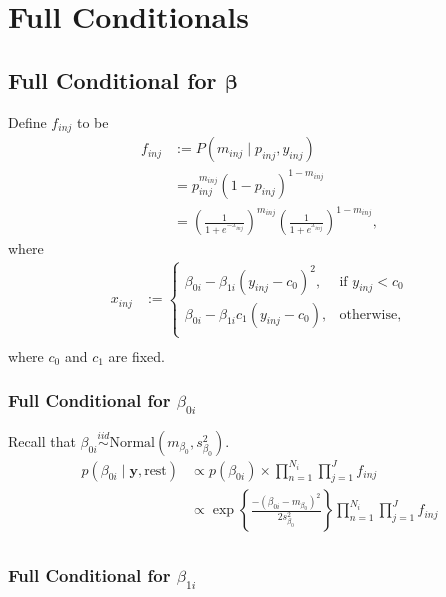 \documentclass[12pt]{article}
\newcommand{\p}[1]{\left(#1\right)}
\newcommand{\bc}[1]{ \left\{#1\right\} }
\newcommand{\N}{ \mathcal{N} }
\newcommand{\iid}{\overset{iid}{\sim}}
\def\N{\text{Normal}}
\def\y{\bm{y}}
\def\rest{\text{rest}}
\begin{document}
\section{Full Conditionals}\label{full-conditionals}

\subsection{\texorpdfstring{Full Conditional for
$\bm \beta$}{Full Conditional for \textbackslash{}bm \textbackslash{}beta}}\label{full-conditional-for-bm-beta}

Define $f_{inj}$ to be
%
\begin{align*}
f_{inj} &:= P(m_{inj} \mid p_{inj}, y_{inj}) \\
&= p_{inj}^{m_{inj}} (1-p_{inj})^{1 - m_{inj}} \\
&= \left(\frac{1}{1+e^{-x_{inj}}} \right)^{m_{inj}}\left(\frac{1}{1+e^{x_{inj}}} \right)^{1-m_{inj}},
\end{align*}
%
where
\begin{align*}
  x_{inj} &:= \begin{cases}
  \beta_{0i} - \beta_{1i}(y_{inj}-c_0)^2, & \text{if } y_{inj} < c_0\nonumber \\
  \beta_{0i} - \beta_{1i}c_1\p{y_{inj}-c_0}, & \text{otherwise}, \nonumber \\
  \end{cases}\\
\end{align*}
where $c_0$ and $c_1$ are fixed.

\subsubsection{\texorpdfstring{Full Conditional for
$\beta_{0i}$}{Full Conditional for \textbackslash{}beta\_\{0i\}}}\label{full-conditional-for-beta_0i}

Recall that $\beta_{0i} \iid \N(m_{\beta_0},s^2_{\beta_0})$.
\begin{align*}
p(\beta_{0i} \mid \y, \rest) &\propto
p(\beta_{0i}) \times \prod_{n=1}^{N_i} \prod_{j=1}^J f_{inj} \\
%
&\propto \exp\bc{\frac{-(\beta_{0i}-m_{\beta_0})^2}{2s^2_{\beta_0}}} \prod_{n=1}^{N_i} \prod_{j=1}^J f_{inj} \\
\end{align*}


\subsubsection{\texorpdfstring{Full Conditional for
$\beta_{1i}$}{Full Conditional for \textbackslash{}beta\_\{1i\}}}\label{full-conditional-for-beta_1i}
\end{document}
